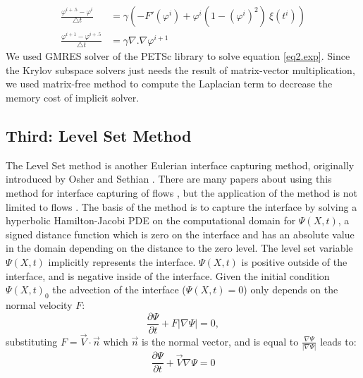 \documentclass[review]{elsarticle}
\begin{document}
\begin{align}
\frac{\varphi^{i+.5}-\varphi^i}{\bigtriangleup t}&= \gamma (-F'(\varphi^i)+\varphi^i (1-(\varphi^i)^2)\ \xi(t^i)) \label{eq1.exp}\\
\frac{\varphi^{i+1}-\varphi^{i+.5}}{\bigtriangleup t} &= \gamma \nabla .\nabla \varphi^{i+1} \label{eq2.exp}
\end{align}
We used GMRES solver of the PETSc \cite{petsc-user-ref} library to solve equation \eqref{eq2.exp}. Since the Krylov subspace solvers just needs the result of matrix-vector multiplication, we used matrix-free method to compute the Laplacian term to decrease the memory cost of implicit solver.


\subsection{Third: Level Set Method} \label{level set}
The Level Set method is another Eulerian interface capturing method, originally introduced by Osher and Sethian  \cite{Osher1988}. There are many papers about using this method for  interface capturing of flows \citep{Kees2011,Losasso2006,Sethian2003}, but the application of the method is not limited to flows \citep{Li2011b,Lie2006}.
The basis of the method is to capture the interface by   solving a hyperbolic Hamilton-Jacobi PDE on 
the computational domain for $\varPsi (X,t)$, a signed distance function which  is zero on the interface and has an absolute value in the domain depending on the distance to the zero level.  The level set variable $\varPsi (X,t)$ implicitly represents the interface. 
 $\varPsi (X,t)$ is  positive outside of the interface, and is negative inside of the interface. 
Given the initial condition $\varPsi (X,t)_0$ the advection of the interface ($\varPsi (X,t)=0$) only depends on the normal velocity $F$:
\begin{equation}\label{levelseteq1}
        \frac{\partial \varPsi}{\partial t} + F |\nabla \varPsi| = 0,
\end{equation}
substituting $F = \overrightarrow{V} \cdot \overrightarrow{n} $ which  $\overrightarrow{n} $ is the normal vector, and is equal to
$ \frac{\nabla \varPsi}{|\nabla \varPsi|}$ leads to:
\begin{equation}\label{levelseteq2}
        \frac{\partial \varPsi}{\partial t} + \overrightarrow{V} \nabla \varPsi = 0
\end{equation}
\end{document}
